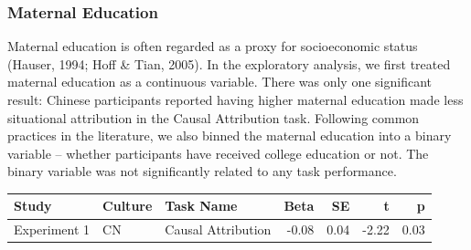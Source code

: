 \documentclass[
  man,floatsintext]{apa6}
\begin{document}
\hypertarget{maternal-education}{%
\subsubsection{Maternal Education}\label{maternal-education}}

Maternal education is often regarded as a proxy for socioeconomic status (Hauser, 1994; Hoff \& Tian, 2005). In the exploratory analysis, we first treated maternal education as a continuous variable. There was only one significant result: Chinese participants reported having higher maternal education made less situational attribution in the Causal Attribution task. Following common practices in the literature, we also binned the maternal education into a binary variable -- whether participants have received college education or not. The binary variable was not significantly related to any task performance.

\begin{table}[H]
\centering\begingroup\fontsize{9.5}{11.5}\selectfont

\begin{tabular}{l|l|l|r|r|r|r}
\hline
Study & Culture & Task Name & Beta & SE & t & p\\
\hline
Experiment 1 & CN & Causal Attribution & -0.08 & 0.04 & -2.22 & 0.03\\
\hline
\end{tabular}
\endgroup{}
\end{table}
\end{document}
